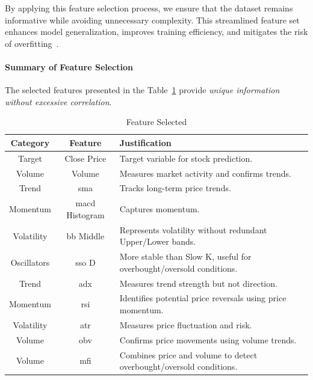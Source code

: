 By applying this feature selection process, we ensure that the dataset remains informative 
while avoiding unnecessary complexity. This streamlined feature set enhances model
generalization, improves training efficiency, and mitigates the risk of 
overfitting~\parencite{shaban2024SMPDL, phuoc2024StockPrediction}.

\paragraph{Summary of Feature Selection} The selected features presented in the
Table~\ref{tab:feature_selection_kept} provide 
\emph{unique information without excessive correlation}.

\begin{table}[H]
    \centering
    \caption{Feature Selected}
    \label{tab:feature_selection_kept}
    \begin{tabular}{ccp{8cm}}
        \hline
        \textbf{Category} & \textbf{Feature} & \textbf{Justification} \\
        \hline\hline
        Target & Close Price & Target variable for stock prediction. \\
        Volume & Volume & Measures market activity and confirms trends. \\
        Trend  & \acrshort{sma} & Tracks long-term price trends.\\
        Momentum & \acrshort{macd} Histogram & Captures momentum. \\
        Volatility & \acrshort{bb} Middle & Represents volatility without 
        redundant Upper/Lower bands. \\
        Oscillators & \acrshort{sso} D & More stable than Slow K, useful for 
        overbought/oversold conditions. \\
        Trend & \acrshort{adx} & Measures trend strength but not direction. \\
        Momentum & \acrshort{rsi} & Identifies potential price reversals
        using price momentum. \\
        Volatility & \acrshort{atr} & Measures price fluctuation and risk. \\
        Volume & \acrshort{obv} & Confirms price movements using volume 
        trends. \\
        Volume & \acrshort{mfi} & Combines price and volume to detect
        overbought/oversold conditions. \\
        \hline
    \end{tabular}
\end{table}

